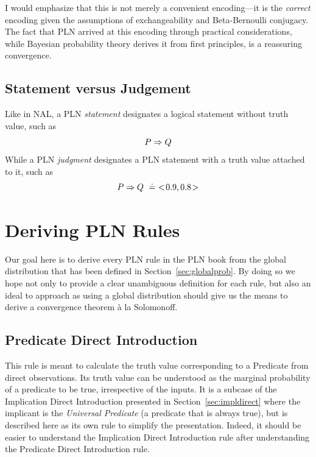 \documentclass[]{article}
\begin{document}
I would emphasize that this is not merely a convenient encoding---it
is the \emph{correct} encoding given the assumptions of exchangeability
and Beta-Bernoulli conjugacy.  The fact that PLN arrived at this
encoding through practical considerations, while Bayesian probability
theory derives it from first principles, is a reassuring convergence.

\subsection{Statement versus Judgement}
\label{sec:statjudge}
Like in NAL, a PLN \emph{statement} designates a logical statement
without truth value, such as
$$P \Rightarrow Q$$ While a PLN \emph{judgment} designates a PLN statement
with a truth value attached to it, such as
$$P \Rightarrow Q\ \doteq\ <\!0.9, 0.8\!>$$

\section{Deriving PLN Rules}
\label{sec:derules}
Our goal here is to derive every PLN rule in the PLN book from the
global distribution that has been defined in
Section~\ref{sec:globalprob}.  By doing so we hope not only to
provide a clear unambiguous definition for each rule, but also an
ideal to approach as using a global distribution should give us the
means to derive a convergence theorem \`{a} la Solomonoff.

\subsection{Predicate Direct Introduction}
\label{sec:bernoulli}
This rule is meant to calculate the truth value corresponding to a
Predicate from direct observations.  Its truth value can be understood
as the marginal probability of a predicate to be true, irrespective of
the inputs.  It is a subcase of the Implication Direct Introduction
presented in Section~\ref{sec:impldirect} where the implicant is the
\emph{Universal Predicate} (a predicate that is always true), but is
described here as its own rule to simplify the presentation.  Indeed,
it should be easier to understand the Implication Direct Introduction
rule after understanding the Predicate Direct Introduction rule.
\end{document}
